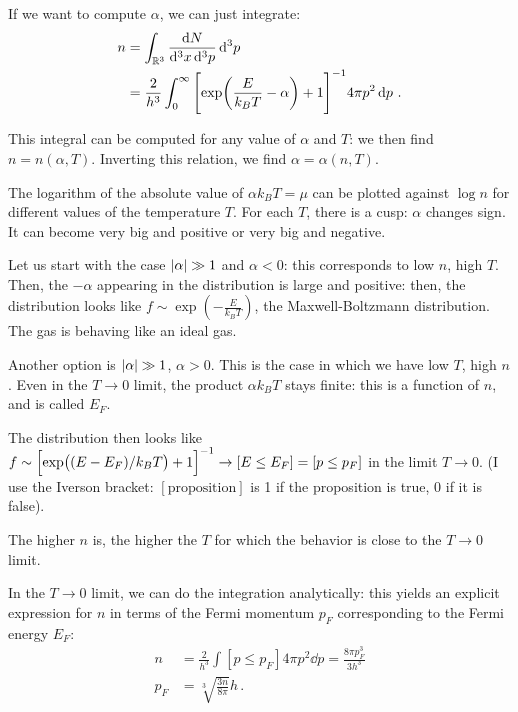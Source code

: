 \documentclass[main.tex]{subfiles}
\begin{document}
If we want to compute \(\alpha \), we can just integrate: 
%
\begin{align}
n &= \int_{\mathbb{R}^3} \frac{ \dd{N}}{ \dd[3]{x} \dd[3]{p}} \dd[3]{p}  \\
&= \frac{2}{h^3} \int_0^{\infty } 
\qty[\exp(\frac{E }{k_B T} - \alpha ) + 1]^{-1} 4 \pi p^2 \dd{p}
\,.
\end{align}

This integral can be computed for any value of \(\alpha \) and \(T\): we then find \(n = n(\alpha , T)\). Inverting this relation, we find \(\alpha = \alpha (n, T)\). 

The logarithm of the absolute value of \(\alpha k_B T = \mu \) can be plotted against \(\log n\) for different values of the temperature \(T\). For each \(T\), there is a cusp: \(\alpha \) changes sign. It can become very big and positive or very big and negative. 


Let us start with the case \(\abs{\alpha } \gg 1 \) and \(\alpha < 0\): this corresponds to low \(n\), high \(T\). 
Then, the \(- \alpha \) appearing in the distribution is large and positive: then, the distribution looks like \(f \sim \exp(- \frac{E}{k_B T})\), the Maxwell-Boltzmann distribution. 
The gas is behaving like an ideal gas. 

Another option is \(\abs{\alpha } \gg 1\), \(\alpha > 0\). This is the case in which we have low \(T\), high \(n\). Even in the \(T \to 0\) limit, the product \(\alpha k_B T \) stays finite: this is a function of \(n\), and is called \(E _F\).

The distribution then looks like \(f \sim \qty[\exp( (E - E_F) / k_B T) + 1]^{-1} \to [E \leq E_F] = [p \leq p_F]\) in the limit \(T \to 0\).
(I use the Iverson bracket: \([\text{proposition}]\) is 1 if the proposition is true, 0 if it is false).  

The higher \(n\) is, the higher the \(T\) for which the behavior is close to the \(T \to 0\) limit. 

In the \(T \to 0\) limit, we can do the integration analytically: this yields an explicit expression for \(n\) in terms of the Fermi momentum \(p_F\) corresponding to the Fermi energy \(E_F\): 
%
\begin{align}
n &= \frac{2}{h^3} \int [p \leq p_F] 4 \pi p^2 \dd{p} = \frac{8 \pi p_F^3}{3 h^3} \\
p_F &= \sqrt[3]{\frac{3n }{8 \pi }} h
\,.
\end{align}
\end{document}
